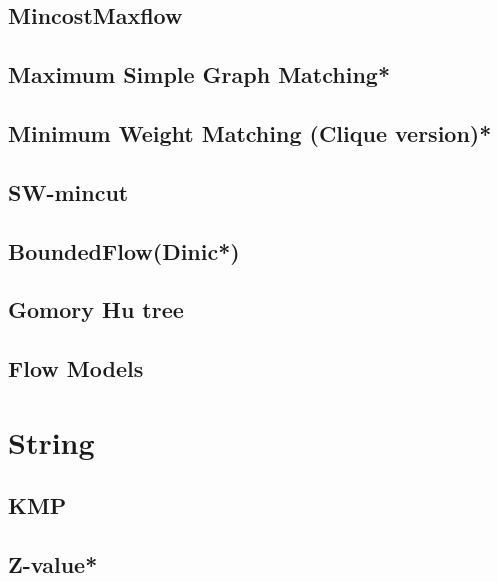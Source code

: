 \subsection{MincostMaxflow}

\subsection{Maximum Simple Graph Matching*} %

\subsection{Minimum Weight Matching (Clique version)*} %

\subsection{SW-mincut}

\subsection{BoundedFlow(Dinic*)} %

\subsection{Gomory Hu tree}

\subsection{Flow Models}

% 


\section{String}
\subsection{KMP}

\subsection{Z-value*} %


